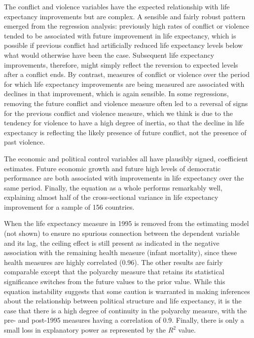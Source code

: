 \documentclass[12pt]{article}
\begin{document}
The conflict and violence variables have the expected relationship with life expectancy improvements but are complex. A sensible and fairly robust pattern emerged from the regression analysis: previously high rates of conflict or violence tended to be associated with future improvement in life expectancy, which is possible if previous conflict had artificially reduced life expectancy levels below what would otherwise have been the case. Subsequent life expectancy improvements, therefore, might simply reflect the reversion to expected levels after a conflict ends. By contrast, measures of conflict or violence over the period for which life expectancy improvements are being measured are associated with declines in that improvement, which is again sensible. In some regressions, removing the future conflict and violence measure often led to a reversal of signs for the previous conflict and violence measure, which we think is due to the tendency for violence to have a high degree of inertia, so that the decline in life expectancy is reflecting the likely presence of future conflict, not the presence of past violence.

The economic and political control variables all have plausibly signed, coefficient estimates. Future economic growth and future high levels of democratic performance are both associated with improvements in life expectancy over the same period. Finally, the equation as a whole performs remarkably well, explaining almost half of the cross-sectional variance in life expectancy improvement for a sample of 156 countries.

When the life expectancy measure in 1995 is removed from the estimating model (not shown)
to ensure no spurious connection between the dependent variable and its lag, the ceiling effect is still present as indicated in the negative association with the remaining health measure (infant mortality), since these health measures are highly correlated (0.96). The other results are fairly comparable except that the polyarchy measure that retains its statistical significance switches from the future values to the prior value. While this equation instability suggests that some caution is warranted in making inferences about the relationship between political structure and life expectancy, it is the case that there is a high degree of continuity in the polyarchy measure, with the pre- and post-1995 measures having a correlation of 0.9. Finally, there is only a small loss in explanatory power as represented by the $R^2$ value.
\end{document}

